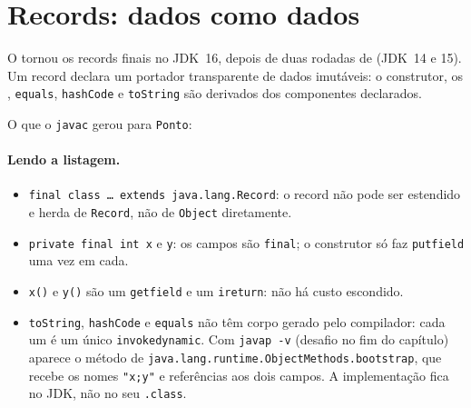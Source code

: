 \section{Records: dados como dados}
\label{sec:records}

O  tornou os records finais no JDK~16, depois de
duas rodadas de  (JDK~14 e 15). Um record declara um portador transparente de dados imutáveis:
o construtor, os ,
\texttt{equals}, \texttt{hashCode} e \texttt{toString} são derivados dos
componentes declarados.



O que o \texttt{javac} gerou para \texttt{Ponto}:


\paragraph{Lendo a listagem.}
\begin{itemize}
\item \texttt{final class \ldots\ extends java.lang.Record}: o record não
  pode ser estendido e herda de \texttt{Record}, não de \texttt{Object}
  diretamente.
\item \texttt{private final int x} e \texttt{y}: os campos são
  \texttt{final}; o construtor só faz \texttt{putfield} uma vez em cada.
\item \texttt{x()} e \texttt{y()} são um \texttt{getfield} e um
  \texttt{ireturn}: não há custo escondido.
\item \texttt{toString}, \texttt{hashCode} e \texttt{equals} não têm
  corpo gerado pelo compilador: cada um é um único
  \texttt{invokedynamic}. Com \texttt{javap -v} (desafio no fim do
  capítulo) aparece o método de 
  \texttt{java.lang.runtime.ObjectMethods.bootstrap}, que recebe os nomes
  \texttt{"x;y"} e referências aos dois campos. A implementação fica no
  JDK, não no seu \texttt{.class}.
\end{itemize}

